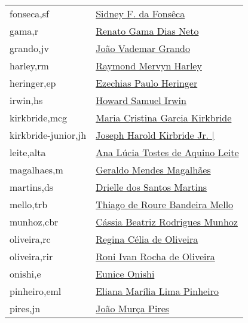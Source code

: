 \begin{longtable}{l l}
fonseca,sf          & \hyperlink{https://plants.jstor.org/stable/10.5555/al.ap.person.bm000117349}{Sidney F. da Fonsêca} \\
gama,r              & \hyperlink{http://lattes.cnpq.br/7699197078019809}{Renato Gama Dias Neto} \\
grando,jv           & \hyperlink{http://lattes.cnpq.br/6229685164094420}{João Vademar Grando} \\
harley,rm           & \hyperlink{https://plants.jstor.org/stable/10.5555/al.ap.person.bm000003418}{Raymond Mervyn Harley} \\
heringer,ep         & \hyperlink{https://plants.jstor.org/stable/10.5555/al.ap.person.bm000003587}{Ezechias Paulo Heringer} \\
irwin,hs            & \hyperlink{https://plants.jstor.org/stable/10.5555/al.ap.person.bm000003953}{Howard Samuel Irwin} \\
kirkbride,mcg       & \hyperlink{-}{Maria Cristina Garcia Kirkbride} \\
kirkbride-junior,jh & \hyperlink{https://plants.jstor.org/stable/10.5555/al.ap.person.bm000011449}{Joseph Harold Kirbride Jr.                        |} \\
leite,alta          & \hyperlink{http://lattes.cnpq.br/7719191749294093 }{Ana Lúcia Tostes de Aquino Leite} \\
magalhaes,m         & \hyperlink{https://plants.jstor.org/stable/10.5555/al.ap.person.bm000005315}{Geraldo Mendes Magalhães} \\
martins,ds          & \hyperlink{http://lattes.cnpq.br/5209656812635059}{Drielle dos Santos Martins} \\
mello,trb           & \hyperlink{http://lattes.cnpq.br/0930415350491316 }{Thiago de Roure Bandeira Mello} \\
munhoz,cbr          & \hyperlink{http://lattes.cnpq.br/9973242126324510}{Cássia Beatriz Rodrigues Munhoz} \\
oliveira,rc         & \hyperlink{http://lattes.cnpq.br/2968817136128886}{Regina Célia de Oliveira} \\
oliveira,rir        & \hyperlink{http://lattes.cnpq.br/7006488728244815}{Roni Ivan Rocha de Oliveira} \\
onishi,e            & \hyperlink{https://plants.jstor.org/stable/10.5555/al.ap.person.bm000053001}{Eunice Onishi} \\
pinheiro,eml        & \hyperlink{http://lattes.cnpq.br/7238835279276067}{Eliana Marília Lima Pinheiro} \\
pires,jn            & \hyperlink{https://plants.jstor.org/stable/10.5555/al.ap.person.bm000006559}{João Murça Pires} \\

\end{longtable}
